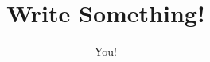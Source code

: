 \documentclass[letterpaper,16pt]{article}
\begin{document}
\title{Write Something!}
\author{You!}
\date{}
\maketitle
\end{document}
